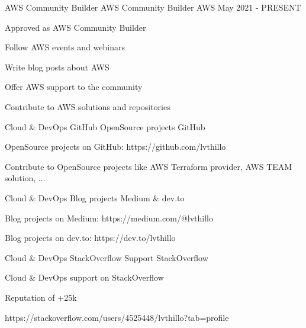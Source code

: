

\begin{cventries}

  \cventry
    {AWS Community Builder} %
    {AWS Community Builder} %
    {AWS} %
    {May 2021 - PRESENT} %
    {
      \begin{cvitems} %
        \item {Approved as AWS Community Builder}
        \item {Follow AWS events and webinars}
        \item {Write blog posts about AWS}
        \item {Offer AWS support to the community}
        \item {Contribute to AWS solutions and repositories}
      \end{cvitems}
    }

  \cventry
    {Cloud \& DevOps} %
    {GitHub OpenSource projects} %
    {GitHub} %
    {} %
    {
      \begin{cvitems} %
        \item {OpenSource projects on GitHub: https://github.com/lvthillo}
        \item {Contribute to OpenSource projects like AWS Terraform provider, AWS TEAM solution, ...}
      \end{cvitems}
    }

  \cventry
    {Cloud \& DevOps} %
    {Blog projects} %
    {Medium \& dev.to} %
    {} %
    {
      \begin{cvitems} %
        \item {Blog projects on Medium: https://medium.com/@lvthillo}
        \item {Blog projects on dev.to: https://dev.to/lvthillo}
      \end{cvitems}
    }

  \cventry
    {Cloud \& DevOps} %
    {StackOverflow Support} %
    {StackOverflow} %
    {} %
    {
      \begin{cvitems} %
        \item {Cloud \& DevOps support on StackOverflow}
        \item {Reputation of +25k}
        \item {https://stackoverflow.com/users/4525448/lvthillo?tab=profile}
      \end{cvitems}
    }


\end{cventries}
